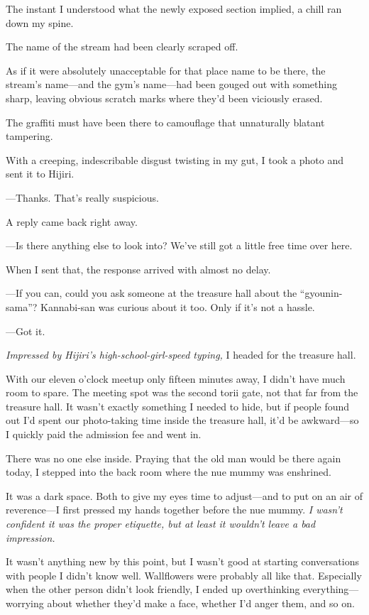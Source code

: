 \documentclass[
    a4paper,
    12pt,
    twoside,
    openany,
    UTF8,
    fontset=windows
]{ctexbook}
\begin{document}
The instant I understood what the newly exposed section implied, a chill ran down my spine.

The name of the stream had been clearly scraped off.

As if it were absolutely unacceptable for that place name to be there, the stream's name---and the gym's name---had been gouged out with something sharp, leaving obvious scratch marks where they'd been viciously erased.

The graffiti must have been there to camouflage that unnaturally blatant tampering.

With a creeping, indescribable disgust twisting in my gut, I took a photo and sent it to Hijiri.

---Thanks. That's really suspicious.

A reply came back right away.

---Is there anything else to look into? We've still got a little free time over here.

When I sent that, the response arrived with almost no delay.

---If you can, could you ask someone at the treasure hall about the ``gyounin-sama''? Kannabi-san was curious about it too. Only if it's not a hassle.

---Got it.

\textit{Impressed by Hijiri's high-school-girl-speed typing,} I headed for the treasure hall.

With our eleven o'clock meetup only fifteen minutes away, I didn't have much room to spare. The meeting spot was the second torii gate, not that far from the treasure hall. It wasn't exactly something I needed to hide, but if people found out I'd spent our photo-taking time inside the treasure hall, it'd be awkward---so I quickly paid the admission fee and went in.

There was no one else inside. Praying that the old man would be there again today, I stepped into the back room where the nue mummy was enshrined.

It was a dark space. Both to give my eyes time to adjust---and to put on an air of reverence---I first pressed my hands together before the nue mummy. \textit{I wasn't confident it was the proper etiquette, but at least it wouldn't leave a bad impression.}

It wasn't anything new by this point, but I wasn't good at starting conversations with people I didn't know well. Wallflowers were probably all like that. Especially when the other person didn't look friendly, I ended up overthinking everything---worrying about whether they'd make a face, whether I'd anger them, and so on.
\end{document}
